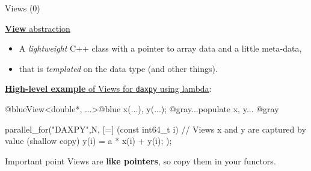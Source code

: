 \begin{frame}[fragile]{Views (0)}

  \ul{\textbf{View} abstraction}
  \begin{itemize}
  \item {A \textit{lightweight} C++ class with a pointer to array data and a little meta-data,}
  \item {that is \textit{templated} on the data type (and other things).}
  \end{itemize}

  \vspace{5pt}

  \ul{\textbf{High-level example} of Views for \texttt{daxpy} using lambda}:

  \begin{code}[frame=single, keywords={}]
@blueView<double*, ...>@blue x(...), y(...);
@gray...populate x, y... @gray

parallel_for("DAXPY",N, [=] (const int64_t i) {
    // Views x and y are captured by value (shallow copy)
    y(i) = a * x(i) + y(i);
  });
  \end{code}

  \pause
  \vspace{0pt}

  \begin{block}{Important point}
    Views are \textbf{like pointers}, so copy them in your functors.
  \end{block}

  \vspace{5pt}

\end{frame}


